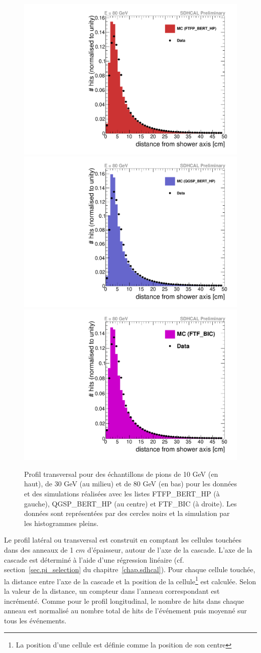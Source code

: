 \begin{figure}[!ht]
  \includegraphics[width=.32\textwidth]{Shower/figs/radProf_pi-_80GeV_ftfp_bert_hp.pdf}
  \includegraphics[width=.32\textwidth]{Shower/figs/radProf_pi-_80GeV_qgsp_bert_hp.pdf}
  \includegraphics[width=.32\textwidth]{Shower/figs/radProf_pi-_80GeV_ftf_bic.pdf}
  \caption{Profil transversal pour des échantillons de pions de 10 GeV (en haut), de 30 GeV (au milieu) et de 80 GeV (en bas) pour les données et des simulations réalisées avec les listes FTFP\_BERT\_HP (à gauche), QGSP\_BERT\_HP (au centre) et FTF\_BIC (à droite). Les données sont représentées par des cercles noirs et la simulation par les histogrammes pleins. \label{fig.pi-radial}}
\end{figure}
Le profil latéral ou transversal est construit en comptant les cellules touchées dans des anneaux de 1 $cm$ d'épaisseur, autour de l'axe de la cascade. L'axe de la cascade est déterminé à l'aide d'une régression linéaire (cf. section~\ref{sec.pi_selection} du chapitre~\ref{chap.sdhcal}). Pour chaque cellule touchée, la distance entre l'axe de la cascade et la position de la cellule\footnote{La position d'une cellule est définie comme la position de son centre} est calculée. Selon la valeur de la distance, un compteur dans l'anneau correspondant est incrémenté. Comme pour le profil longitudinal, le nombre de hits dans chaque anneau est normalisé au nombre total de hits de l'événement puis moyenné sur tous les événements. 
